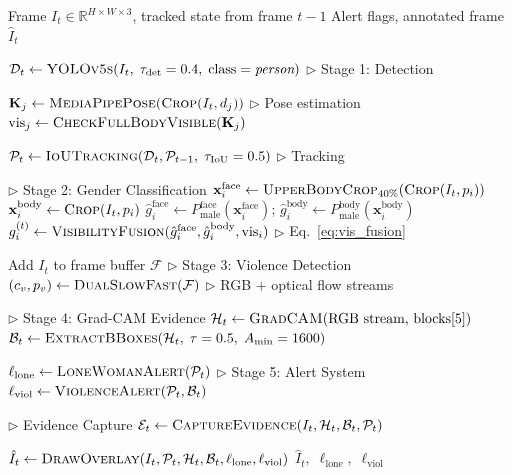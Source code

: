 \documentclass[11pt,a4paper]{article}
\newcommand{\R}{\mathbb{R}}
\begin{document}
\begin{algorithm}[H]
\caption{Women Safety System: Frame Processing Pipeline}\label{alg:pipeline}
\begin{algorithmic}[1]
\Require Frame $I_t \in \R^{H \times W \times 3}$, tracked state from frame $t{-}1$
\Ensure Alert flags, annotated frame $\hat{I}_t$

\State $\mathcal{D}_t \gets \textsc{YOLOv5s}(I_t,\; \tau_{\text{det}}=0.4,\; \text{class}=\textit{person})$ \hfill $\triangleright$ Stage 1: Detection

    \State $\mathbf{K}_j \gets \textsc{MediaPipePose}(\textsc{Crop}(I_t, d_j))$ \hfill $\triangleright$ Pose estimation
    \State $\text{vis}_j \gets \textsc{CheckFullBodyVisible}(\mathbf{K}_j)$
\EndFor

\State $\mathcal{P}_t \gets \textsc{IoUTracking}(\mathcal{D}_t, \mathcal{P}_{t-1},\; \tau_{\text{IoU}}=0.5)$ \hfill $\triangleright$ Tracking

 \hfill $\triangleright$ Stage 2: Gender Classification
    \State $\mathbf{x}_i^{\text{face}} \gets \textsc{UpperBodyCrop}_{40\%}(\textsc{Crop}(I_t, p_i))$
    \State $\mathbf{x}_i^{\text{body}} \gets \textsc{Crop}(I_t, p_i)$
    \State $\hat{g}_i^{\text{face}} \gets P_{\text{male}}^{\text{face}}(\mathbf{x}_i^{\text{face}})$; \quad $\hat{g}_i^{\text{body}} \gets P_{\text{male}}^{\text{body}}(\mathbf{x}_i^{\text{body}})$
    \State $g_i^{(t)} \gets \textsc{VisibilityFusion}(\hat{g}_i^{\text{face}}, \hat{g}_i^{\text{body}}, \text{vis}_i)$ \hfill $\triangleright$ Eq.~\eqref{eq:vis_fusion}
\EndFor

\State Add $I_t$ to frame buffer $\mathcal{F}$ \hfill $\triangleright$ Stage 3: Violence Detection
\State $(c_v, p_v) \gets \textsc{DualSlowFast}(\mathcal{F})$ \hfill $\triangleright$ RGB + optical flow streams

 \hfill $\triangleright$ Stage 4: Grad-CAM Evidence
    \State $\mathcal{H}_t \gets \textsc{GradCAM}(\text{RGB stream, blocks[5]})$
    \State $\mathcal{B}_t \gets \textsc{ExtractBBoxes}(\mathcal{H}_t,\; \tau=0.5,\; A_{\min}=1600)$
\EndIf

\State $\ell_{\text{lone}} \gets \textsc{LoneWomanAlert}(\mathcal{P}_t)$ \hfill $\triangleright$ Stage 5: Alert System
\State $\ell_{\text{viol}} \gets \textsc{ViolenceAlert}(\mathcal{P}_t, \mathcal{B}_t)$

 \hfill $\triangleright$ Evidence Capture
    \State $\mathcal{E}_t \gets \textsc{CaptureEvidence}(I_t, \mathcal{H}_t, \mathcal{B}_t, \mathcal{P}_t)$
\EndIf

\State $\hat{I}_t \gets \textsc{DrawOverlay}(I_t, \mathcal{P}_t, \mathcal{H}_t, \mathcal{B}_t, \ell_{\text{lone}}, \ell_{\text{viol}})$
\State \Return $\hat{I}_t,\; \ell_{\text{lone}},\; \ell_{\text{viol}}$
\end{algorithmic}
\end{algorithm}
\end{document}

